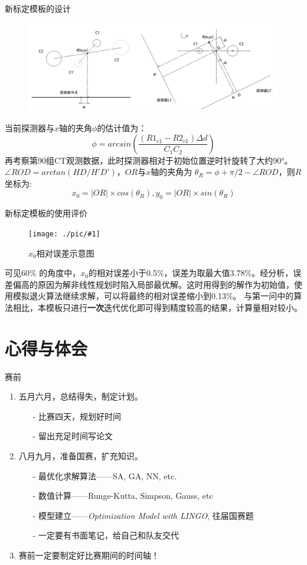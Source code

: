 \documentclass{beamer}
\newcommand{\midpic}[2]{  \begin{figure}[H]
\centering
\texttt{[image: ./pic/\#1]}\\
\caption{#2}
\end{figure}}
\begin{document}
\begin{frame}{新标定模板的设计}
	\begin{figure}[H]
		\centering
		\includegraphics[width=\textwidth]{./pic/merge1.png}\\
	\end{figure}
	\small 当前探测器与\(x\)轴的夹角\(\phi\)的估计值为：
	\[ \phi = arcsin\left(  \frac{(R1_{c1} - R2_{c1})\Delta d}{C_1 C_2}   \right)\]
	\small 再考察第90组CT观测数据，此时探测器相对于初始位置逆时针旋转了大约90°。\(\angle ROD = arctan(HD/H'D') \)，\(OR\)与\(x\)轴的夹角为 \( \theta _R = \phi + \pi/2 - \angle ROD \)，则\(R\)坐标为:
	\[x_0 = |OR| \times cos(\theta_R), y_0 = |OR| \times sin(\theta_R) \]
	
\end{frame}

\begin{frame}{新标定模板的使用评价}
	\midpic{Error.png}{\(x_0\)相对误差示意图}
	\small 可见60\% 的角度中，\(x_0\)的相对误差小于0.5\%，误差为取最大值3.78\%。经分析，误差偏高的原因为解非线性规划时陷入局部最优解。这时用得到的解作为初始值，使用模拟退火算法继续求解，可以将最终的相对误差缩小到0.13\%。
	\small 与第一问中的算法相比，本模板只进行\textbf{一次}迭代优化即可得到精度较高的结果，计算量相对较小。
\end{frame}




\section{心得与体会}
\begin{frame}{赛前}
	\begin{enumerate}
	  \item 五月六月，总结得失，制定计划。
		\begin{enumerate}
		  \item[-] 比赛四天，规划好时间
		  \item[-] 留出充足时间写论文
		\end{enumerate}
	  \item 八月九月，准备国赛，扩充知识。
		\begin{enumerate}
		  \item[-] 最优化求解算法——SA, GA, NN, etc.
		  \item[-] 数值计算——Runge-Kutta, Simpson, Gauss, etc
		  \item[-] 模型建立——\emph{Optimization Model with LINGO}, 往届国赛题
		  \item[-] 一定要有书面笔记，给自己和队友交代
		\end{enumerate}
	  \item 赛前一定要制定好比赛期间的时间轴！
	\end{enumerate}
  \end{frame}
\end{document}
